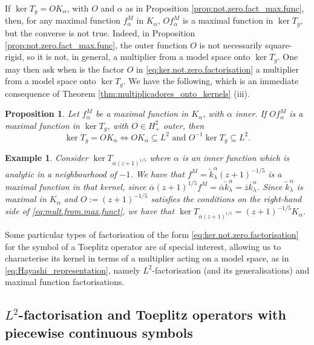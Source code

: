 \documentclass[12pt]{elsarticle}
\numberwithin{equation}{section}
\theoremstyle{plain}
\newtheorem{prop}[thm]{Proposition}
\newtheorem{ex}[thm]{Example}
\newcommand{\Hp}{\ensuremath{H^2_+}}
\newcommand{\ol}[1]{\ensuremath{\overline{#1}}}
\renewcommand{\subset}{\subseteq}
\begin{document}
If $\ker T_g = O K_\alpha$, with $O$ and $\alpha$ as in Proposition \ref{prop:not.zero.fact_max.func}, then, for any maximal function $f^M_\alpha$ in $K_\alpha$, $O f^M_\alpha$ is a maximal function in $\ker T_g$, but the converse is not true.
Indeed, in Proposition \ref{prop:not.zero.fact_max.func}, the outer function $O$ is not necessarily square-rigid, so it is not, in general, a multiplier from a model space onto $\ker T_g$.
One may then ask when is the factor $O$ in \eqref{eq:ker.not.zero.factorisation} a multiplier from a model space onto $\ker T_g$.
We have the following, which is an immediate consequence of Theorem \ref{thm:multiplicadores_onto_kernels} (iii).

\begin{prop}
\label{prop:mult.from.max.funct}
Let $f_\alpha^M$ be a maximal function in $K_\alpha$, with $\alpha$ inner.
If $Of_\alpha^M$ is a maximal function in $\ker T_g$, with $O\in\Hp$ outer, then
\begin{equation}
\label{eq:mult.from.max.funct}
\ker T_g = O K_\alpha \iff OK_\alpha \subset L^2 \text{ and } O^{-1} \ker T_g \subset L^2.
\end{equation}
\end{prop}


\begin{ex}
Consider $\ker T_{\ol\alpha (z+1)^{1/5}}$ where $\alpha$ is an inner function which is analytic in a neighbourhood of $-1$.
We have that $f^M = \tilde k^\alpha_\lambda (z+1)^{-1/5}$ is a maximal function in that kernel, since $\ol\alpha (z+1)^{1/5} f^M = \ol\alpha \tilde k^\alpha_\lambda = \ol z \ol k^\alpha_\lambda$.
Since $\tilde k^\alpha_\lambda$ is maximal in $K_\alpha$ and $O := (z+1)^{-1/5}$ satisfies the conditions on the right-hand side of \eqref{eq:mult.from.max.funct}, we have that $\ker T_{\ol\alpha (z+1)^{1/5}} = (z+1)^{-1/5} K_\alpha$.
\end{ex}


Some particular types of factorisation of the form \eqref{eq:ker.not.zero.factorisation} for the symbol of a Toeplitz operator are of special interest, allowing us to characterise its kernel in terms of a multiplier acting on a model space, as in \eqref{eq:Hayashi_representation}, namely $L^2$-factorisation (and its generalisations) and maximal function factorisations.





\subsection{$L^2$-factorisation and Toeplitz operators with piecewise continuous symbols}
\label{subsec:L2_fact_PC_symbols}
\end{document}
